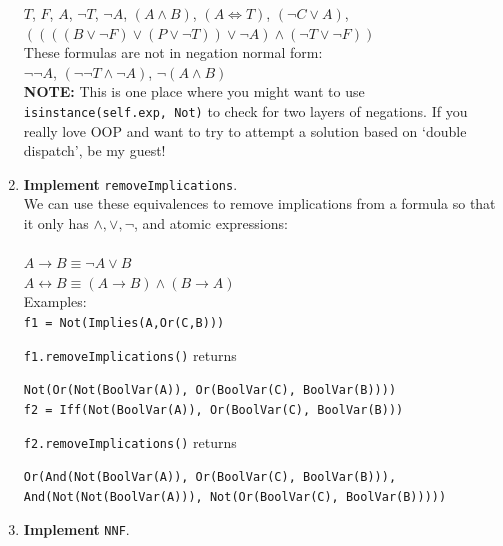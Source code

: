 \documentclass[12pt]{article}
\newenvironment{problem}[2][Problem]{\begin{trivlist}
\item[\hskip \labelsep {\bfseries #1}\hskip \labelsep {\bfseries #2.}]}{\end{trivlist}}
\begin{document}
\begin{problem}{2}
\begin{enumerate}[label=\Alph*.]
$T$, 
$F$, 
$A$, 
$\neg T$, 
$\neg A$, 
$(A \land B)$, 
$(A \Leftrightarrow T)$, 
$(\neg C \lor A)$, 
$((((B \lor \neg F) \lor (P \lor \neg T)) \lor \neg A) \land (\neg T \lor \neg F))$ \\

These formulas are not in negation normal form: \\

$\neg \neg A$, 
$(\neg \neg T \land \neg A)$,
$\neg (A \land B)$ \\ 


\textbf{NOTE:} This is one place where you might want to use \texttt{isinstance(self.exp, Not)} to check for two layers of negations. If you really love OOP and want to try to attempt a solution based on `double dispatch', be my guest!



\item \textbf{Implement} \texttt{removeImplications}. \\



We can use these equivalences to remove implications from a formula so that  it only has $\land, \lor, \neg$, and atomic expressions: \\ \\

$A \rightarrow B \equiv \neg A \lor B$ \\

$A \leftrightarrow B \equiv (A \rightarrow B) \land (B \rightarrow A)$ \\ 

Examples: \\ 

\texttt{f1 = Not(Implies(A,Or(C,B)))} 

\texttt{f1.removeImplications()} returns 

\texttt{Not(Or(Not(BoolVar(A)), Or(BoolVar(C), BoolVar(B))))} \\ 

\texttt{f2 = Iff(Not(BoolVar(A)), Or(BoolVar(C), BoolVar(B)))} 

\texttt{f2.removeImplications()}  returns

\texttt{Or(And(Not(BoolVar(A)), Or(BoolVar(C), BoolVar(B))), And(Not(Not(BoolVar(A))), Not(Or(BoolVar(C), BoolVar(B)))))} 


\newpage


\item \textbf{Implement} \texttt{NNF}. \\


\end{enumerate}
\end{problem}
\end{document}
